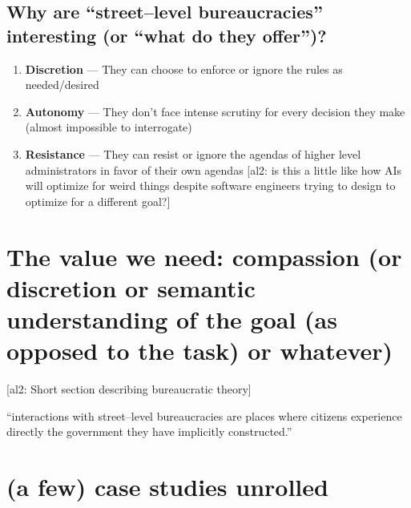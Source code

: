 \documentclass[10pt]{article}
\newcommand{\ali}[1]{{\color{Red}[al2: #1]}}
\begin{document}
\subsection{Why are ``street--level bureaucracies'' interesting (or ``what do they offer'')?}
\begin{enumerate}
  \item \textbf{Discretion} --- They can choose to enforce or ignore the rules as needed/desired
  \item \textbf{Autonomy}   --- They don't face intense scrutiny for every decision they make (almost impossible to interrogate)
  \item \textbf{Resistance} --- They can resist or ignore the agendas of higher level administrators in favor of their own agendas
  \ali{is this a little like how AIs will optimize for weird things despite software engineers trying to design to optimize for a different goal?}
\end{enumerate}

\section{The value we need: compassion (or discretion or semantic understanding of the {goal} (as opposed to the task) or whatever)}
\ali{Short section describing bureaucratic theory}

``interactions with street--level bureaucracies are places where citizens experience directly the government they have implicitly constructed.''



\section{(a few) case studies unrolled}
\end{document}
